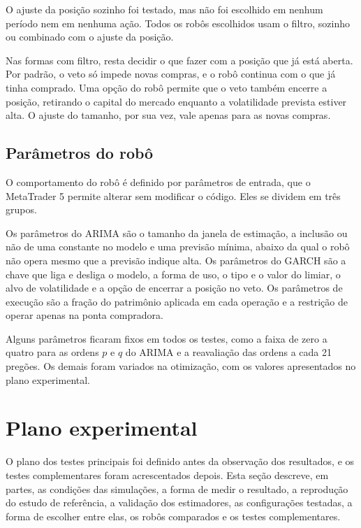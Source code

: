 O ajuste da posição sozinho foi testado, mas não foi escolhido em nenhum período
nem em nenhuma ação. Todos os robôs escolhidos usam o filtro, sozinho ou combinado
com o ajuste da posição.

Nas formas com filtro, resta decidir o que fazer com a posição que já está aberta.
Por padrão, o veto só impede novas compras, e o robô continua com o que já tinha
comprado. Uma opção do robô permite que o veto também encerre a posição, retirando
o capital do mercado enquanto a volatilidade prevista estiver alta. O ajuste do
tamanho, por sua vez, vale apenas para as novas compras.

\subsection{Parâmetros do robô}
\label{sec:parametros}

O comportamento do robô é definido por parâmetros de entrada, que o MetaTrader 5
permite alterar sem modificar o código. Eles se dividem em três grupos.

Os parâmetros do ARIMA são o tamanho da janela de estimação, a inclusão ou não de
uma constante no modelo e uma previsão mínima, abaixo da qual o robô não opera
mesmo que a previsão indique alta. Os parâmetros do GARCH são a chave que liga e
desliga o modelo, a forma de uso, o tipo e o valor do limiar, o alvo de
volatilidade e a opção de encerrar a posição no veto. Os parâmetros de execução são a fração do patrimônio aplicada em cada
operação e a restrição de operar apenas na ponta compradora.

Alguns parâmetros ficaram fixos em todos os testes, como a faixa de zero a quatro
para as ordens $p$ e $q$ do ARIMA e a reavaliação das ordens a cada 21 pregões. Os demais foram
variados na otimização, com os valores apresentados no plano experimental.

\section{Plano experimental}

O plano dos testes principais foi definido antes da observação dos resultados, e os
testes complementares foram acrescentados depois. Esta seção
descreve, em partes, as condições das simulações, a forma de medir o resultado, a
reprodução do estudo de referência, a validação dos estimadores, as configurações testadas, a forma de escolher
entre elas, os robôs comparados e os testes complementares.

